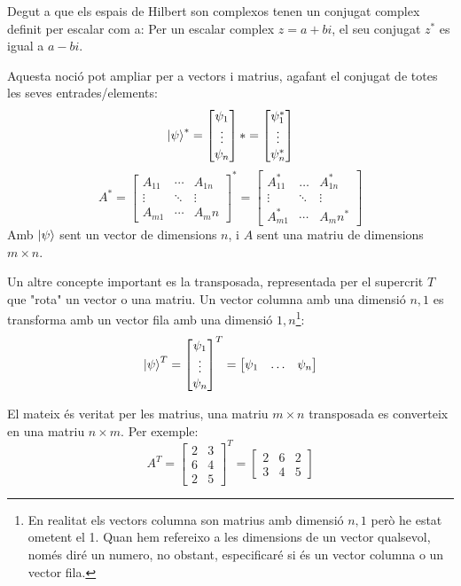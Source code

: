 Degut a que els espais de Hilbert son complexos tenen un conjugat complex definit per escalar com a: Per un escalar complex $z=a +bi$, el seu conjugat $z^*$ es igual a $a-bi$. 

Aquesta noció pot ampliar per a vectors i matrius, agafant el conjugat de totes les seves entrades/elements:
$$
\ket{\psi}^{*} = 
	\begin{bmatrix} \psi_{1} \\ \vdots \\ \psi_{n} \end{bmatrix}* = \begin{bmatrix} \psi_{1}^* \\ \vdots \\ \psi_{n}^* \end{bmatrix}
$$
$$
A^{*} = 
	\begin{bmatrix} 
	A_{11} & \cdots & A_{1n}\\ 
	\vdots & \ddots & \vdots \\ 
	A_{m1} & \cdots & A_mn
\end{bmatrix}^* 
= \begin{bmatrix} 
	A_{11}^* & \dots & A_{1n}^*\\ 
	\vdots & \ddots & \vdots \\ 
	A_{m1}^* & \cdots & A_mn^*
\end{bmatrix}
$$
Amb $\ket{\psi}$ sent un vector de dimensions $n$, i $A$ sent una matriu de dimensions $m \times n$.

Un altre concepte important es la transposada, representada per el supercrit $T$ que "rota" un vector o una matriu. Un vector columna amb una dimensió $n,1$ es transforma amb un vector fila amb una dimensió $1,n$\footnote{En realitat els vectors columna son matrius amb dimensió $n,1$ però he estat ometent el 1. Quan hem refereixo a les dimensions de un vector qualsevol, només diré un numero, no obstant, especificaré si és un vector columna o un vector fila.}:
$$
\ket{\psi}^{T} = 
	\begin{bmatrix} \psi_{1} \\ \vdots \\ \psi_{n} \end{bmatrix}^T = \begin{bmatrix} \psi_{1} & \dots & \psi_{n} \end{bmatrix}
$$

El mateix és veritat per les matrius, una matriu $m\times n$ transposada es converteix en una matriu $n \times m$. Per exemple:
$$
A^T = \begin{bmatrix}
	 2 & 3 \\
	 6 & 4 \\
	 2 & 5 
\end{bmatrix}^T = \begin{bmatrix}
 2 & 6 & 2 \\
 3 & 4 & 5
\end{bmatrix}
$$

